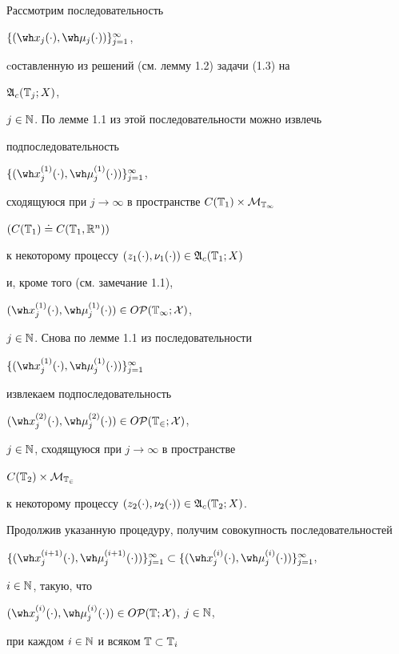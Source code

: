 \begin{pf}


Рассмотрим последовательность


$\{(\wh x_j(\cdot),\wh\mu_j(\cdot))\}_{j=1}^\infty$,


cоставленную из решений (см. лемму 1.2) задачи (1.3) на


$\frak A_c(\Bbb T_j;X)$,


$j\in\Bbb N$. По лемме 1.1 из этой последовательности можно извлечь


подпоследовательность


$\{(\wh x{}_j^{(1)}(\cdot),\wh\mu{}_j^{(1)}(\cdot))\}_{j=1}^\infty$,


сходящуюся при $j\to\infty$ в пространстве $C(\Bbb T_1)\times\cal M_{\Bbb T_1}$


$(C(\Bbb T_1)\doteq C(\Bbb T_1,\Bbb R^n))$


к некоторому процессу $(z_1(\cdot),\nu_1(\cdot))\in\frak A_c(\Bbb T_1;X)$


и, кроме того (см. замечание 1.1),


$(\wh x{}_j^{(1)}(\cdot),\wh\mu{}_j^{(1)}(\cdot))\in O\cal P(\Bbb T_1;X)$,


$j\in\Bbb N$. Снова по лемме 1.1 из последовательности


$\{(\wh x{}_j^{(1)}(\cdot),\wh\mu{}_j^{(1)}(\cdot))\}_{j=1}^\infty$


извлекаем подпоследовательность


$(\wh x{}_j^{(2)}(\cdot),\wh\mu{}_j^{(2)}(\cdot))\in O\cal P(\Bbb T_2;X)$,


$j\in\Bbb N$, сходящуюся при $j\to\infty$ в пространстве


$C(\Bbb T_2)\times\cal M_{\Bbb T_2}$


к некоторому процессу $(z_2(\cdot),\nu_2(\cdot))\in\frak A_c(\Bbb T_2;X)$.


Продолжив указанную процедуру, получим совокупность последовательностей


$\{(\wh x{}_j^{(i+1)}(\cdot),\wh\mu{}_j^{(i+1)}(\cdot))\}_{j=1}^\infty


\subset\{(\wh x{}_j^{(i)}(\cdot),\wh\mu{}_j^{(i)}(\cdot))\}_{j=1}^\infty$,


$i\in\Bbb N$, такую, что


$(\wh x{}_j^{(i)}(\cdot),\wh\mu{}_j^{(i)}(\cdot))\in


O\cal P(\Bbb T;X)$, $j\in\Bbb N$,


при каждом $i\in\Bbb N$ и всяком $\Bbb T\subset\Bbb T_i$



\end{pf}
